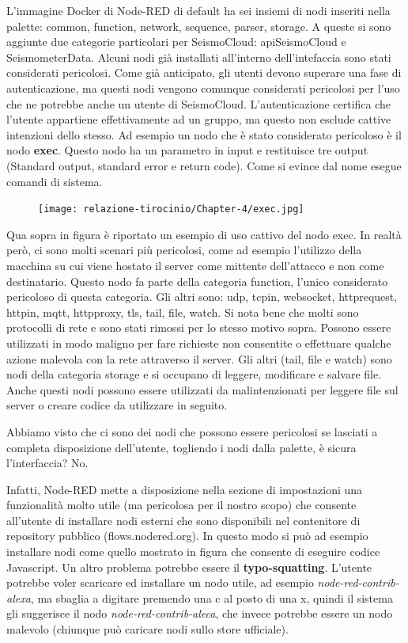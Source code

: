 \documentclass[a4paper,10pt]{memoir}
\begin{document}
L'immagine Docker di Node-RED di default ha sei insiemi di nodi inseriti nella palette: common, function, network, sequence, parser, storage.
A queste si sono aggiunte due categorie particolari per SeismoCloud: apiSeismoCloud e SeismometerData.
Alcuni nodi già installati all'interno dell'intefaccia sono stati considerati pericolosi.
Come già anticipato, gli utenti devono superare una fase di autenticazione, ma questi nodi vengono comunque considerati pericolosi per l'uso che ne potrebbe anche un utente di SeismoCloud. L'autenticazione certifica che l'utente appartiene effettivamente ad un gruppo, ma questo non esclude cattive intenzioni dello stesso.
Ad esempio un nodo che è stato considerato pericoloso è il nodo \textbf{exec}. Questo nodo ha un parametro in input e restituisce tre output (Standard output, standard error e return code). Come si evince dal nome esegue comandi di sistema. 
\begin{figure}[ht]
    \texttt{[image: relazione-tirocinio/Chapter-4/exec.jpg]}
    \label{fig:exec}
\end{figure}
Qua sopra in figura è riportato un esempio di uso cattivo del nodo exec. In realtà però, ci sono molti scenari più pericolosi, come ad esempio l'utilizzo della macchina su cui viene hostato il server come mittente dell'attacco e non come destinatario.
Questo nodo fa parte della categoria function, l'unico considerato pericoloso di questa categoria.
Gli altri sono: udp, tcpin, websocket, httprequest, httpin,
mqtt, httpproxy, tls, tail, file,
watch.
Si nota bene che molti sono protocolli di rete e sono stati rimossi per lo stesso motivo sopra. Possono essere utilizzati in modo maligno per fare richieste non consentite o effettuare qualche azione malevola con la rete attraverso il server.
Gli altri (tail, file e watch) sono nodi della categoria storage e si occupano di leggere, modificare e salvare file.
Anche questi nodi possono essere utilizzati da malintenzionati per leggere file sul server o creare codice da utilizzare in seguito.

Abbiamo visto che ci sono dei nodi che possono essere pericolosi se lasciati a completa disposizione dell'utente, togliendo i nodi dalla palette, è sicura l'interfaccia? No.

Infatti, Node-RED mette a disposizione nella sezione di impostazioni una funzionalità molto utile (ma pericolosa per il nostro scopo) che consente all'utente di installare nodi esterni che sono disponibili nel contenitore di repository pubblico (flows.nodered.org).
In questo modo si può ad esempio installare nodi come quello mostrato in figura che consente di eseguire codice Javascript.
Un altro problema potrebbe essere il \textbf{typo-squatting}. L'utente potrebbe voler scaricare ed installare un nodo utile, ad esempio \textit{node-red-contrib-alexa}, ma sbaglia a digitare premendo una c al posto di una x, quindi il sistema gli suggerisce il nodo \textit{node-red-contrib-aleca}, che invece potrebbe essere un nodo malevolo (chiunque può caricare nodi sullo store ufficiale).
\end{document}
